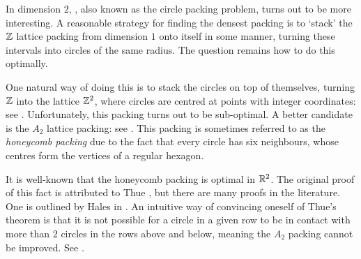 In dimension $2$, , also known as the circle packing problem, turns out to be more interesting. A reasonable strategy for finding the densest packing is to `stack' the $\mathbb{Z}$ lattice packing from dimension $1$ onto itself in some manner, turning these intervals into circles of the same radius. The question remains how to do this optimally.

One natural way of doing this is to stack the circles on top of themselves, turning $\mathbb{Z}$ into the lattice $\mathbb{Z}^2$, where circles are centred at points with integer coordinates: see . Unfortunately, this packing turns out to be sub-optimal. A better candidate is the $A_2$ lattice packing: see . This packing is sometimes referred to as the \textit{honeycomb packing} due to the fact that every circle has six neighbours, whose centres form the vertices of a regular hexagon.

It is well-known that the honeycomb packing is optimal in $\mathbb{R}^2$. The original proof of this fact is attributed to Thue \cite{Thue}, but there are many proofs in the literature. One is outlined by Hales in \cite[p. 442]{CannonHoney}. An intuitive way of convincing oneself of Thue's theorem is that it is not possible for a circle in a given row to be in contact with more than $2$ circles in the rows above and below, meaning the $A_2$ packing cannot be improved. See .

